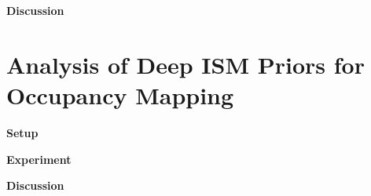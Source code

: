 \textbf{Discussion}
%
\section{Analysis of Deep ISM Priors for Occupancy Mapping}
\label{sec:exp_analyze_prior_properties}
\textbf{Setup}

\textbf{Experiment}

\textbf{Discussion}
